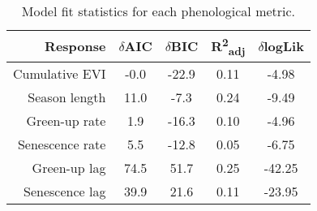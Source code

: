 \begin{table}[h]
\centering
\begin{tabular}{rcccc}
  \hline
Response & $\delta$AIC & $\delta$BIC & R\textsuperscript{2}\textsubscript{adj} & $\delta$logLik \\ 
  \hline
Cumulative EVI & -0.0 & -22.9 & 0.11 & -4.98 \\ 
  Season length & 11.0 & -7.3 & 0.24 & -9.49 \\ 
  Green-up rate & 1.9 & -16.3 & 0.10 & -4.96 \\ 
  Senescence rate & 5.5 & -12.8 & 0.05 & -6.75 \\ 
  Green-up lag & 74.5 & 51.7 & 0.25 & -42.25 \\ 
  Senescence lag & 39.9 & 21.6 & 0.11 & -23.95 \\ 
   \hline
\end{tabular}
\caption{Model fit statistics for each phenological metric.} 
\label{mod_stat}
\end{table}


